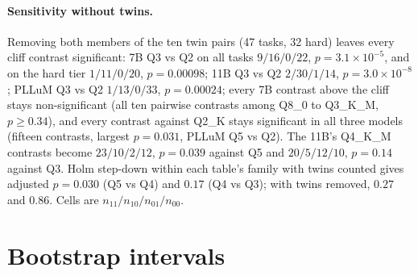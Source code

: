 \documentclass[11pt]{article}
\begin{document}
\paragraph{Sensitivity without twins.} Removing both members of the ten twin pairs (47 tasks, 32 hard) leaves every cliff contrast significant: 7B Q3 vs Q2 on all tasks $9/16/0/22$, $p=3.1\times10^{-5}$, and on the hard tier $1/11/0/20$, $p=0.00098$; 11B Q3 vs Q2 $2/30/1/14$, $p=3.0\times10^{-8}$; PLLuM Q3 vs Q2 $1/13/0/33$, $p=0.00024$; every 7B contrast above the cliff stays non-significant (all ten pairwise contrasts among Q8\_0 to Q3\_K\_M, $p\ge0.34$), and every contrast against Q2\_K stays significant in all three models (fifteen contrasts, largest $p=0.031$, PLLuM Q5 vs Q2). The 11B's Q4\_K\_M contrasts become $23/10/2/12$, $p=0.039$ against Q5 and $20/5/12/10$, $p=0.14$ against Q3. Holm step-down within each table's family with twins counted gives adjusted $p=0.030$ (Q5 vs Q4) and $0.17$ (Q4 vs Q3); with twins removed, $0.27$ and $0.86$. Cells are $n_{11}/n_{10}/n_{01}/n_{00}$.

\FloatBarrier
\Needspace*{0.45\textheight}
\section{Bootstrap intervals}
\label{app:bootstrap}
\end{document}
